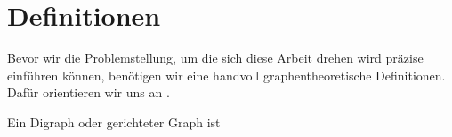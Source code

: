 \chapter{Definitionen}
\label{chapter:definitions}

Bevor wir die Problemstellung, um die sich diese Arbeit drehen wird präzise
einführen können, benötigen wir eine handvoll graphentheoretische Definitionen.
Dafür orientieren wir uns an \cite[Chapter 1]{GraphsNetworks}.

\begin{definition}[Digraph]
    Ein Digraph oder gerichteter Graph ist 
\end{definition}